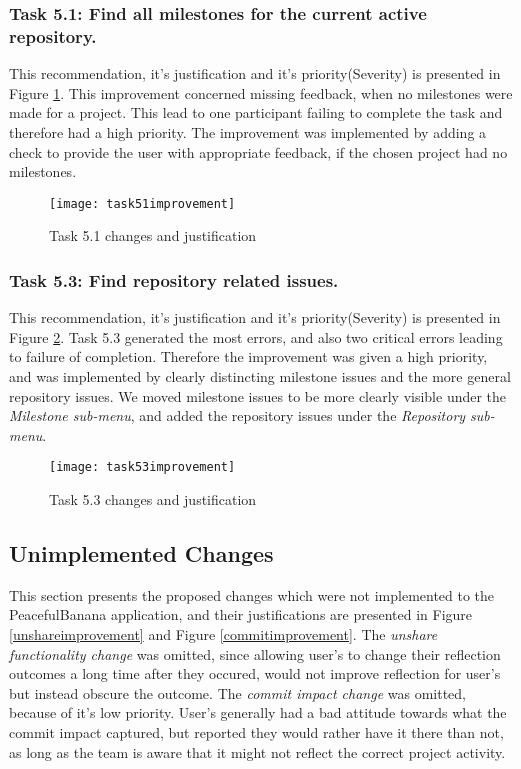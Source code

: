\subsubsection*{Task 5.1: Find all milestones for the current active repository.}
This recommendation, it's justification and it's priority(Severity) is presented in Figure \ref{task51improvement}. This improvement concerned missing feedback, when no milestones were made for a project. This lead to one participant failing to complete the task and therefore had a high priority. The improvement was implemented by adding a check to provide the user with appropriate feedback, if the chosen project had no milestones. 
\begin{figure}[h!]
    \centering
        \texttt{[image: task51improvement]}
    \caption{Task 5.1 changes and justification}
    \label{task51improvement}
\end{figure}

\subsubsection*{Task 5.3: Find repository related issues.} 
This recommendation, it's justification and it's priority(Severity) is presented in Figure \ref{task53improvement}. Task 5.3 generated the most errors, and also two critical errors leading to failure of completion. Therefore the improvement was given a high priority, and was implemented by clearly distincting milestone issues and the more general repository issues. We moved milestone issues to be more clearly visible under the \emph{Milestone sub-menu}, and added the repository issues under the \emph{Repository sub-menu}. 
\begin{figure}[H]
    \centering
        \texttt{[image: task53improvement]}
    \caption{Task 5.3 changes and justification}
    \label{task53improvement}
\end{figure}

\subsection*{Unimplemented Changes}
This section presents the proposed changes which were not implemented to the PeacefulBanana application, and their justifications are presented in Figure \ref{unshareimprovement} and Figure \ref{commitimprovement}. The \emph{unshare functionality change} was omitted, since allowing user's to change their reflection outcomes a long time after they occured, would not improve reflection for user's but instead obscure the outcome. The \emph{commit impact change} was omitted, because of it's low priority. User's generally had a bad attitude towards what the commit impact captured, but reported they would rather have it there than not, as long as the team is aware that it might not reflect the correct project activity. 
